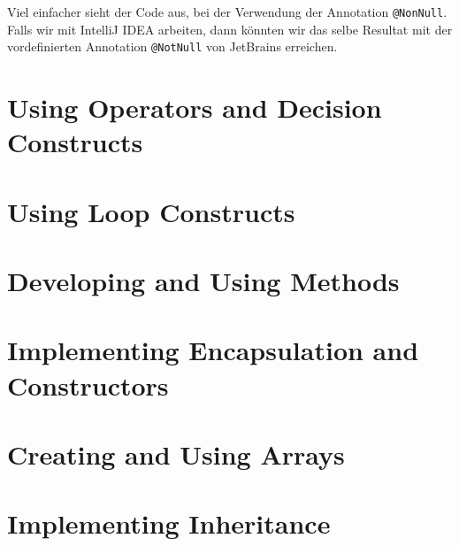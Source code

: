 Viel einfacher sieht der Code aus, bei der Verwendung der Annotation 
\texttt{@NonNull}. Falls wir mit IntelliJ IDEA arbeiten, dann
könnten wir das selbe Resultat mit der vordefinierten Annotation 
\texttt{@NotNull} von JetBrains erreichen.


\section{Using Operators and Decision Constructs}
\section{Using Loop Constructs}
\section{Developing and Using Methods}
\section{Implementing Encapsulation and Constructors}
\section{Creating and Using Arrays}
\section{Implementing Inheritance}
